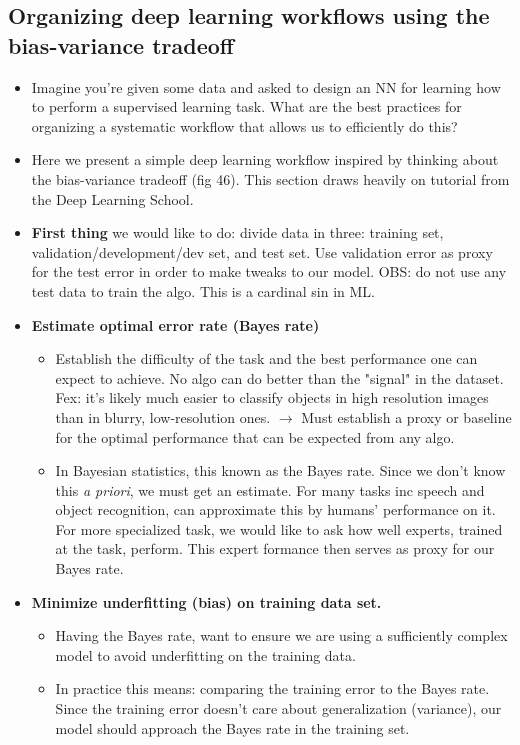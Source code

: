 \documentclass[norsk,a4paper,11pt]{article}
\begin{document}
\subsection{Organizing deep learning workflows using the bias-variance tradeoff}
\begin{itemize}
	\item Imagine you're given some data and asked to design an NN for learning how to perform a supervised learning task. What are the best practices for organizing a systematic workflow that allows us to efficiently do this?
	\item Here we present a simple deep learning workflow inspired by thinking about the bias-variance tradeoff (fig 46). This section draws heavily on tutorial from the Deep Learning School.
	\item \textbf{First thing} we would like to do: divide data in three: training set, validation/development/dev set, and test set. Use validation error as proxy for the test error in order to make tweaks to our model. OBS: do not use any test data to train the algo. This is a cardinal sin in ML.
	\item \textbf{Estimate optimal error rate (Bayes rate)}
	\begin{itemize}
		\item Establish the difficulty of the task and the best performance one can expect to achieve. No algo can do better than the "signal" in the dataset. Fex: it's likely much easier to classify objects in high resolution images than in blurry, low-resolution ones. $\rightarrow$ Must establish a proxy or baseline for the optimal performance that can be expected from any algo. 
		\item In Bayesian statistics, this known as the Bayes rate. Since we don't know this \textit{a priori}, we must get an estimate. For many tasks inc speech and object recognition, can approximate this by humans' performance on it. For more specialized task, we would like to ask how well experts, trained at the task, perform. This expert formance then serves as proxy for our Bayes rate.
	\end{itemize}
	\item \textbf{Minimize underfitting (bias) on training data set.}
	\begin{itemize}
		\item Having the Bayes rate, want to ensure we are using a sufficiently complex model to avoid underfitting on the training data.
		\item In practice this means: comparing the training error to the Bayes rate. Since the training error doesn't care about generalization (variance), our model should approach the Bayes rate in the training set.

\end{itemize}
\end{itemize}
\end{document}
